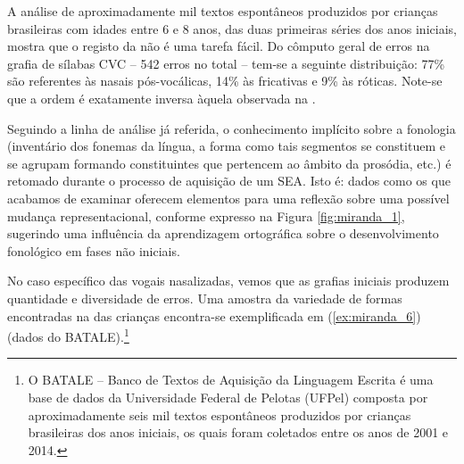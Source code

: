 \documentclass[output=paper]{LSP/langsci}
\begin{document}
A análise de aproximadamente mil textos espontâneos produzidos por crianças brasileiras com idades entre 6 e 8 anos, das duas primeiras séries dos anos iniciais, mostra que o registo da  não é uma tarefa fácil. Do cômputo geral de erros na grafia de sílabas CVC -- 542 erros no total -- tem-se a seguinte distribuição: 77\% são referentes às nasais pós-vocálicas, 14\% às fricativas e 9\% às róticas. Note-se que a ordem é exatamente inversa àquela observada na . 

Seguindo a linha de análise já referida, o conhecimento implícito sobre a fonologia (inventário dos fonemas da língua, a forma como tais segmentos se constituem e se agrupam formando constituintes que pertencem ao âmbito da prosódia, etc.) é retomado durante o processo de aquisição de um SEA. Isto é: dados como os que acabamos de examinar oferecem elementos para uma reflexão sobre uma possível mudança representacional, conforme expresso na Figura \ref{fig:miranda_1}, sugerindo uma influência da aprendizagem ortográfica sobre o desenvolvimento fonológico em fases não iniciais. 

No caso específico das vogais nasalizadas, vemos que as grafias iniciais produzem quantidade e diversidade de erros. Uma amostra da variedade de formas encontradas na  das crianças encontra-se exemplificada em (\ref{ex:miranda_6}) (dados do BATALE).\footnote{O BATALE – Banco de Textos de Aquisição da Linguagem Escrita é uma base de dados da Universidade Federal de Pelotas (UFPel) composta por aproximadamente seis mil textos espontâneos produzidos por crianças brasileiras dos anos iniciais, os quais foram coletados entre os anos de 2001 e 2014.}

\ea\label{ex:miranda_6}
\z
\z
\end{document}
